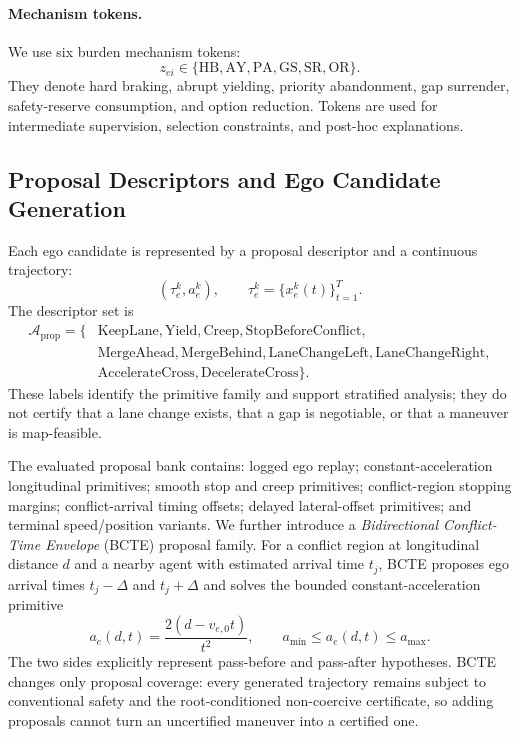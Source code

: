 \documentclass[10pt]{article}
\begin{document}
\paragraph{Mechanism tokens.}
We use six burden mechanism tokens:
\begin{equation}
    z_{ei}\in
    \{
    \mathrm{HB},
    \mathrm{AY},
    \mathrm{PA},
    \mathrm{GS},
    \mathrm{SR},
    \mathrm{OR}
    \}.
\end{equation}
They denote hard braking, abrupt yielding, priority abandonment, gap surrender, safety-reserve consumption, and option reduction. Tokens are used for intermediate supervision, selection constraints, and post-hoc explanations.

\subsection{Proposal Descriptors and Ego Candidate Generation}
\label{app:ego_candidates}

Each ego candidate is represented by a proposal descriptor and a continuous trajectory:
\begin{equation}
    (\tau^k_e,a^k_e), \qquad
    \tau^k_e=\{x^k_e(t)\}_{t=1}^{T}.
\end{equation}
The descriptor set is
\begin{equation}
\begin{aligned}
    \mathcal{A}_{\mathrm{prop}}
    =
    \{
    &\mathrm{KeepLane},
    \mathrm{Yield},
    \mathrm{Creep},
    \mathrm{StopBeforeConflict},\\
    &\mathrm{MergeAhead},
    \mathrm{MergeBehind},
    \mathrm{LaneChangeLeft},
    \mathrm{LaneChangeRight},\\
    &\mathrm{AccelerateCross},
    \mathrm{DecelerateCross}
    \}.
\end{aligned}
\end{equation}
These labels identify the primitive family and support stratified analysis; they do not certify that a lane change exists, that a gap is negotiable, or that a maneuver is map-feasible.

The evaluated proposal bank contains: logged ego replay; constant-acceleration longitudinal primitives; smooth stop and creep primitives; conflict-region stopping margins; conflict-arrival timing offsets; delayed lateral-offset primitives; and terminal speed/position variants.  We further introduce a \emph{Bidirectional Conflict-Time Envelope} (BCTE) proposal family.  For a conflict region at longitudinal distance $d$ and a nearby agent with estimated arrival time $t_j$, BCTE proposes ego arrival times $t_j-\Delta$ and $t_j+\Delta$ and solves the bounded constant-acceleration primitive
\begin{equation}
    a_e(d,t)=\frac{2(d-v_{e,0}t)}{t^2},
    \qquad
    a_{\min}\le a_e(d,t)\le a_{\max}.
\end{equation}
The two sides explicitly represent pass-before and pass-after hypotheses.  BCTE changes only proposal coverage: every generated trajectory remains subject to conventional safety and the root-conditioned non-coercive certificate, so adding proposals cannot turn an uncertified maneuver into a certified one.
\end{document}
